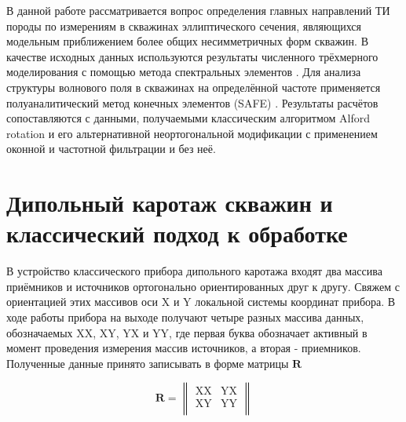 \documentclass[a4paper,11pt]{article}
\begin{document}
В данной работе рассматривается вопрос определения главных направлений ТИ породы по измерениям в скважинах эллиптического сечения, являющихся модельным приближением более общих несимметричных форм скважин. В качестве исходных данных используются результаты численного трёхмерного моделирования с помощью метода спектральных элементов \cite{Komatitsch2000}. Для анализа структуры волнового поля в скважинах на определённой частоте применяется полуаналитический метод конечных элементов (SAFE) \cite{Bartoli2006}. Результаты расчётов сопоставляются с данными, получаемыми классическим алгоритмом Alford rotation \cite{Alford1986} и его альтернативной неортогональной модификации \cite{Dellinger1998} с применением оконной и частотной фильтрации и без неё.

\section{Дипольный каротаж скважин и классический подход к обработке}
В устройство классического прибора дипольного каротажа входят два массива приёмников и источников ортогонально ориентированных друг к другу. Свяжем с ориентацией этих массивов оси X и Y локальной системы координат прибора. В ходе работы прибора на выходе получают четыре разных массива данных, обозначаемых XX, XY, YX и YY, где первая буква обозначает активный в момент проведения измерения массив источников, а вторая - приемников. Полученные данные принято записывать в форме матрицы $\mathbf{R}$ 

$$
	\mathbf{R} = \left\|
	\begin{array}{cc}
	\text{XX} & \text{YX} \\
	\text{XY} & \text{YY} \\
	\end{array}
	\right\| 
$$
\end{document}
